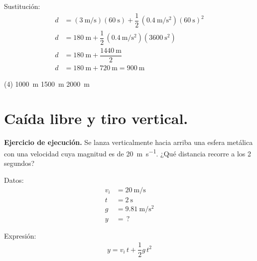 \documentclass[12pt, letter]{exam}
\begin{document}
\begin{questions}
    Sustitución:
    \begin{align*}
    d &= \left( \SI[per-mode=fraction]{3}{\meter\per\second} \right) \left( \SI{60}{\second} \right) + \dfrac{1}{2} \, \left( \SI[per-mode=fraction]{0.4}{\meter\per\square\second} \right) \left( \SI{60}{\second} \right)^{2} \\[0.5em]
    d &= \SI{180}{\meter} + \dfrac{1}{2} \, \left( \SI[per-mode=fraction]{0.4}{\meter\per\square\second} \right) \left( \SI{3600}{\square\second} \right) \\[0.5em]
    d &= \SI{180}{\meter} + \dfrac{\SI{1440}{\meter}}{2} \\[0.5em]
    d &= \SI{180}{\meter} + \SI{720}{\meter} = \SI{900}{\meter}
    \end{align*}
    \begin{tasks}(4)
        \task {}
        \task \SI{1000}{\meter}
        \task \SI{1500}{\meter}
        \task \SI{2000}{\meter}
    \end{tasks}

    \section{Caída libre y tiro vertical.}

    \setcounter{question}{8} \question \label{Ejercicio_06} \textbf{Ejercicio de ejecución. } Se lanza verticalmente hacia arriba una esfera metálica con una velocidad cuya magnitud es de \SI{20}{\meter\per\second}. ¿Qué distancia recorre a los \num{2} segundos?

    \begin{minipage}[t]{0.35\linewidth}
    Datos: 
    \begin{align*}
    v_{i} &= \SI{20}{\meter\per\second} \\
    t &= \SI{2}{\second} \\
    g &= \SI{9.81}{\meter\per\square\second} \\
    y &= \, ?
    \end{align*}
    \end{minipage}
    \hspace{1cm}
    \begin{minipage}[t]{0.4\linewidth}
    Expresión:
    \begin{align*}
    y = v_{i} \, t + \dfrac{1}{2} g \, t^{2}
    \end{align*}
    \end{minipage}


\end{questions}
\end{document}
